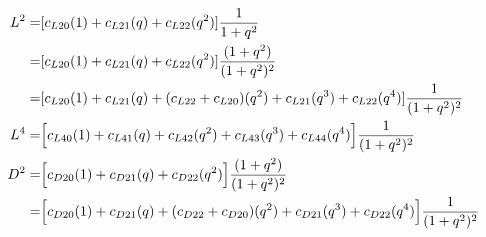 \documentclass[12pt]{article}
\begin{document}
\begin{align}
    L^2 =& [ c_{L20}(1) + c_{L21}(q)  + c_{L22}(q^2)]\frac{1}{1+q^2}\\
    =& [ c_{L20}(1) + c_{L21}(q)  + c_{L22}(q^2)]\frac{(1+q^2)}{(1+q^2)^2}\\
    =& [ c_{L20}(1) + c_{L21}(q)  + (c_{L22} +  c_{L20})(q^2) + c_{L21}(q^3)  + c_{L22}(q^4)]\frac{1}{(1+q^2)^2}\\
    L^4 =&  \Bigl[ c_{L40}(1) +  c_{L41}(q) + c_{L42}(q^2) + c_{L43}(q^3) + c_{L44}(q^4) \Bigr]\frac{1}{(1+q^2)^2}\\
    D^2 =& \Bigl[ c_{D20}(1) + c_{D21}(q) + c_{D22}(q^2)\Bigr]\frac{(1+q^2)}{(1+q^2)^2}\\
    =& \Bigl[ c_{D20}(1) + c_{D21}(q) + (c_{D22} + c_{D20})(q^2) + c_{D21}(q^3) + c_{D22}(q^4)\Bigr]\frac{1}{(1+q^2)^2}
\end{align}
\end{document}

